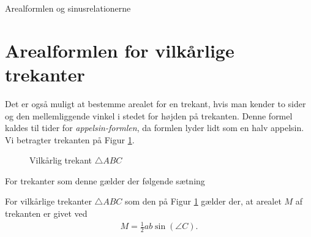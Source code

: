 
\begin{center}
\Huge
	Arealformlen og sinusrelationerne
\end{center}

\section*{Arealformlen for vilkårlige trekanter}

Det er også muligt at bestemme arealet for en trekant, hvis man kender to sider og den mellemliggende vinkel i stedet for højden på trekanten. Denne formel kaldes til tider for \textit{appelsin-formlen}, da formlen lyder lidt som en halv appelsin. Vi betragter trekanten på Figur \ref{fig:vilkårlig}.
\begin{figure}[H]
	\centering
	\caption{Vilkårlig trekant $\triangle ABC$}
	\label{fig:vilkårlig}
\end{figure}
For trekanter som denne gælder der følgende sætning
\begin{setn}
	\label{setn:areal}
	For vilkårlige trekanter $\triangle ABC$ som den på Figur \ref{fig:vilkårlig} gælder der,
	 at arealet $M$ af trekanten er givet ved
	 \begin{align*}
	 	M = \frac{1}{2}ab \sin(\angle C).
	 \end{align*}
\end{setn}
